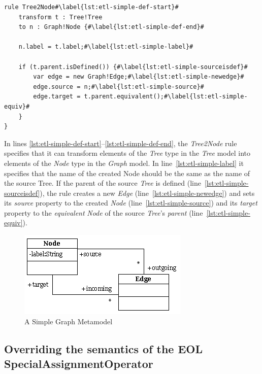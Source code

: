 \begin{lstlisting}[float=h, caption=Exemplar ETL Rule demonstrating the \emph{equivalent()} operation, label=lst:SimpleETLTransformationRule, language=ETL, escapechar=\#]
rule Tree2Node#\label{lst:etl-simple-def-start}#
	transform t : Tree!Tree
	to n : Graph!Node {#\label{lst:etl-simple-def-end}#
	
	n.label = t.label;#\label{lst:etl-simple-label}#
	
	if (t.parent.isDefined()) {#\label{lst:etl-simple-sourceisdef}#
		var edge = new Graph!Edge;#\label{lst:etl-simple-newedge}#
		edge.source = n;#\label{lst:etl-simple-source}#
		edge.target = t.parent.equivalent();#\label{lst:etl-simple-equiv}#
	}
}
\end{lstlisting}


In lines \ref{lst:etl-simple-def-start}--\ref{lst:etl-simple-def-end}, the \emph{Tree2Node} rule specifies that it can transform elements of the \emph{Tree} type in the \emph{Tree} model into elements of the \emph{Node} type in the \emph{Graph} model. In line~\ref{lst:etl-simple-label} it specifies that the name of the created Node should be the same as the name of the source Tree. If the parent of the source \emph{Tree} is defined (line~\ref{lst:etl-simple-sourceisdef}), the rule creates a new \emph{Edge} (line~\ref{lst:etl-simple-newedge}) and sets its \emph{source} property to the created \emph{Node} (line~\ref{lst:etl-simple-source}) and its \emph{target} property to the \emph{equivalent} \emph{Node} of the source \emph{Tree}'s \emph{parent} (line~\ref{lst:etl-simple-equiv}).

\begin{figure}
	\centering
		\includegraphics{images/Graph.png}
	\caption{A Simple Graph Metamodel}
	\label{fig:Graph}
\end{figure}


\subsection{Overriding the semantics of the EOL SpecialAssignmentOperator}
\label{sec:Design.ETL.SpecialAssignmentOperator}


